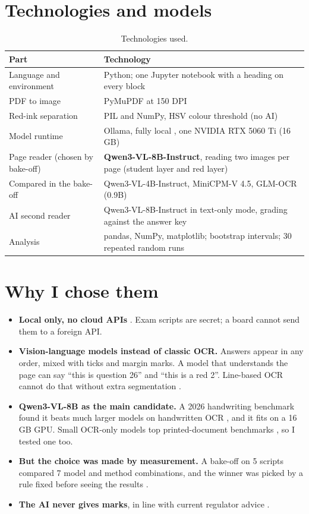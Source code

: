 \section{Technologies and models}
\begin{table}[H]
\centering
\small
\caption{Technologies used.}
\label{tab:tech}
\begin{tabularx}{\linewidth}{@{}P{4.3cm}L@{}}
\toprule
\textbf{Part} & \textbf{Technology} \\
\midrule
Language and environment & Python; one Jupyter notebook with a heading on every block \\
PDF to image & PyMuPDF at 150 DPI \citep{pymupdf} \\
Red-ink separation & PIL and NumPy, HSV colour threshold (no AI) \\
Model runtime & Ollama, fully local \citep{ollama}, one NVIDIA RTX 5060 Ti (16\,GB) \\
Page reader (chosen by bake-off) & \textbf{Qwen3-VL-8B-Instruct}, reading two images per page (student layer and red layer) \\
Compared in the bake-off & Qwen3-VL-4B-Instruct, MiniCPM-V 4.5, GLM-OCR (0.9B) \\
AI second reader & Qwen3-VL-8B-Instruct in text-only mode, grading against the answer key \\
Analysis & pandas, NumPy, matplotlib; bootstrap intervals; 30 repeated random runs \\
\bottomrule
\end{tabularx}
\end{table}

\section{Why I chose them}
\begin{itemize}
  \item \textbf{Local only, no cloud APIs} . Exam scripts are secret; a board cannot send them to a foreign API.
  \item \textbf{Vision-language models instead of classic OCR.} Answers appear in any order, mixed with ticks and margin
        marks. A model that understands the page can say ``this is question 26'' and ``this is a red 2''. Line-based OCR
        cannot do that without extra segmentation .
  \item \textbf{Qwen3-VL-8B as the main candidate.} A 2026 handwriting benchmark found it beats much larger models on
        handwritten OCR \citep{omnihand2026}, and it fits on a 16\,GB GPU. Small OCR-only models top printed-document
        benchmarks \citep{roboflowocr2026}, so I tested one too.
  \item \textbf{But the choice was made by measurement.} A bake-off on 5 scripts compared 7 model and method combinations,
        and the winner was picked by a rule fixed before seeing the results .
  \item \textbf{The AI never gives marks}, in line with current regulator advice \citep{ofqual2026}.
\end{itemize}

